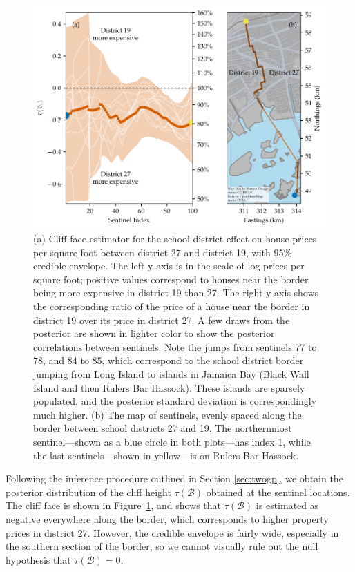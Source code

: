 \documentclass[letter]{article}
\makeatletter
\def\maxwidth{\ifdim\Gin@nat@width>\linewidth\linewidth
\else\Gin@nat@width\fi}
\let\Oldincludegraphics\includegraphics
\renewcommand{\includegraphics}[1]{\Oldincludegraphics[width=0.9\maxwidth]{#1}}
\newcommand{\border}{\mathcal{B}}
\makeatother
\begin{document}
    	\begin{figure}
\centering
\includegraphics{../NYC/NYC_plots/NYC_cliff_face.pdf}
\caption{\label{fig:NYC_cliff_face}
(a)
Cliff face estimator for the school district effect on house prices per square foot between district 27 and district 19, with 95\% credible envelope.
The left y-axis is in the scale of log prices per square foot; positive values correspond to houses near the border being more expensive in district 19 than 27.
The right y-axis shows the corresponding ratio of the price of a house near the border in district 19 over its price in district 27.
A few draws from the posterior are shown in lighter color to show the posterior correlations between sentinels.
Note the jumps from sentinels 77 to 78, and 84 to 85, which correspond to the school district border jumping from Long Island to islands in Jamaica Bay (Black Wall Island and then Rulers Bar Hassock).
These islands are sparsely populated, and the posterior standard deviation is correspondingly much higher.
(b)
The map of sentinels, evenly spaced along the border between school districts 27 and 19.
The northernmost sentinel---shown as a blue circle in both plots---has index 1, while the last sentinels---shown in yellow---is on Rulers Bar Hassock.}
\end{figure}
    


    	Following the inference procedure outlined in Section \ref{sec:twogp}, we obtain the posterior distribution of the cliff height \(\tau(\border)\) obtained at the sentinel locations.
The cliff face is shown in Figure~\ref{fig:NYC_cliff_face}, and shows that \(\tau(\border)\) is estimated as negative everywhere along the border, which corresponds to higher property prices in district 27.
However, the credible envelope is fairly wide, especially in the southern section of the border, so we cannot visually rule out the null hypothesis that \(\tau(\border)=0\).
\end{document}
